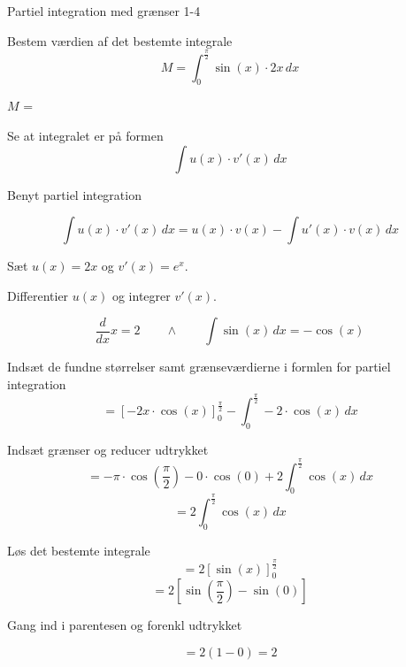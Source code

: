 \documentclass{article}
\begin{document}
\newpage

\begin{exercise}{Partiel integration med grænser 1-4}
	
	
	Bestem værdien af det bestemte integrale
	\[
	M = \int_0^{\frac{\pi}{2}} \sin(x) \cdot 2x \, dx
	\]
	
	$M$ =  
	
	
	\hint
	
	Se at integralet er på formen
	\[
	\int u(x) \cdot v'(x) \, dx
	\]
	
	\hint
	
	Benyt partiel integration
	
	\hint
	\[
	\int u(x) \cdot v'(x)\, dx = u(x) \cdot v(x) - \int u'(x) \cdot v(x) \, dx
	\]
	\hint
	
	Sæt $u(x) = 2x$ og $v'(x) = e^x$.
	
	
	\hint
	
	Differentier $u(x)$ og integrer $v'(x)$.
	
	\hint
	\[
	\frac{d}{dx}x = 2 \qquad \wedge \qquad \int \sin(x) \, dx = - \cos(x)
	\]
	
	\hint
	
	Indsæt de fundne størrelser samt grænseværdierne i formlen for partiel integration 
	\[
	= \left[-2x \cdot \cos(x) \right]_{0}^{\frac{\pi}{2}} - \int_{0}^{\frac{\pi}{2}} -2 \cdot \cos(x) \, dx 
	\]
	
	\hint
	
	Indsæt grænser og reducer udtrykket
	\[
	= - \pi \cdot \cos\left(\frac{\pi}{2}\right) - 0 \cdot \cos(0)  + 2 \int_{0}^{\frac{\pi}{2}} \cos(x) \, dx
	\]
	\[
	=  2 \int_{0}^{\frac{\pi}{2}} \cos(x) \, dx 
	\]
	
	\hint
	Løs det bestemte integrale
	\[
	= 2 \left[ \sin(x) \right]_0^{\frac{\pi}{2}}
	\]
	\[
	= 2 \left[ \sin\left(\frac{\pi}{2}\right) - \sin(0)  \right]
	\]
	
	\hint
	Gang ind i parentesen og forenkl udtrykket
	
	\hint
	\[
	= 2 ( 1 - 0) = 2 	
	\]
	
	
	
\end{exercise}

\newpage
\end{document}
